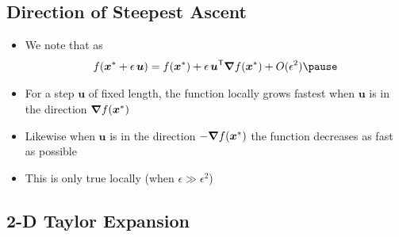\begin{slide}
\section{Direction of Steepest Ascent}

\begin{PauseHighLight}
  \begin{itemize}
  \item We note that as
    \begin{align*}
      f(\bm{x}^* + \epsilon\, \bm{u}) = f(\bm{x}^*) + \epsilon\,
      \bm{u}^\tr \grad f(\bm{x}^*) + O(\epsilon^2)\pause
    \end{align*}
  \item For a step $\bm{u}$ of fixed length, the function locally grows
    fastest when $\bm{u}$ is in the direction $\bm{\nabla} f(\bm{x}^*)$\pause
  \item Likewise when $\bm{u}$ is in the direction $-\bm{\nabla}
    f(\bm{x}^*)$ the function decreases as fast as possible\pause
  \item This is only true locally (when $\epsilon \gg \epsilon^2$)\pause
  \end{itemize}
\end{PauseHighLight}

\end{slide}


\Outline %

\begin{slide}
\section[-2]{2-D Taylor Expansion}
\pb \pause {}
\begin{center}
  \pause
\end{center}
\end{slide}


